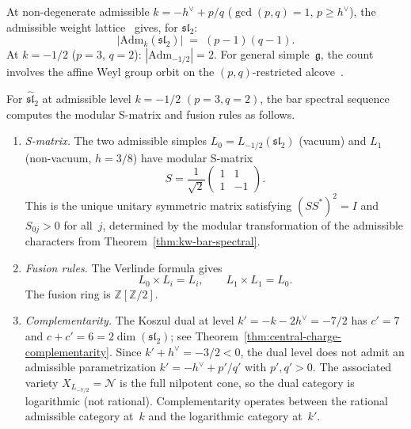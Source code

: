 \begin{remark}
\label{rem:admissible-module-count}
At non-degenerate admissible $k = -h^\vee + p/q$ ($\gcd(p,q) = 1$, $p \geq h^\vee$), the admissible weight lattice~\cite{KW88} gives, for $\mathfrak{sl}_2$:
\[
\bigl|\mathrm{Adm}_k(\mathfrak{sl}_2)\bigr|
\;=\; (p-1)(q-1).
\]
At $k = -1/2$ ($p = 3$, $q = 2$): $|\mathrm{Adm}_{-1/2}| = 2$.  For general simple~$\mathfrak{g}$, the count involves the affine Weyl group orbit on the $(p,q)$-restricted alcove~\cite{KW88}.
\end{remark}

\begin{proposition}
\label{prop:admissible-verlinde-bar}
For $\widehat{\mathfrak{sl}}_2$ at admissible level
$k = -1/2$ $(p = 3, q = 2)$, the bar spectral sequence
computes the modular S-matrix and fusion rules as follows.
\begin{enumerate}[label=\textup{(\roman*)}]
\item \emph{S-matrix.}  The two admissible simples
  $L_0 = L_{-1/2}(\mathfrak{sl}_2)$ (vacuum) and
  $L_1$ (non-vacuum, $h = 3/8$) have modular S-matrix
  \begin{equation}\label{eq:admissible-s-matrix}
  S = \frac{1}{\sqrt{2}}
  \begin{pmatrix}
  1 & 1 \\[3pt]
  1 & -1
  \end{pmatrix}.
  \end{equation}
  This is the unique unitary symmetric matrix satisfying
  $(SS^*)^2 = I$ and $S_{0j} > 0$ for all~$j$, determined
  by the modular transformation of the admissible characters
  from Theorem~\textup{\ref{thm:kw-bar-spectral}}.
\item \emph{Fusion rules.}  The Verlinde formula gives
  \begin{equation}\label{eq:admissible-fusion}
  L_0 \times L_i = L_i, \qquad
  L_1 \times L_1 = L_0.
  \end{equation}
  The fusion ring is $\mathbb{Z}[\mathbb{Z}/2]$.
\item \emph{Complementarity.}  The Koszul dual at level
  $k' = -k - 2h^\vee = -7/2$ has $c' = 7$ and
  $c + c' = 6 = 2\dim(\mathfrak{sl}_2)$;
  see Theorem~\ref{thm:central-charge-complementarity}.
  Since $k' + h^\vee = -3/2 < 0$, the dual level does not
  admit an admissible parametrization
  $k' = -h^\vee + p'/q'$ with $p', q' > 0$.  The associated variety
  $X_{L_{-7/2}} = \mathcal{N}$ is the full nilpotent cone,
  so the dual category is logarithmic (not rational).
  Complementarity operates between the rational admissible
  category at~$k$ and the logarithmic category at~$k'$.
\end{enumerate}
\end{proposition}

